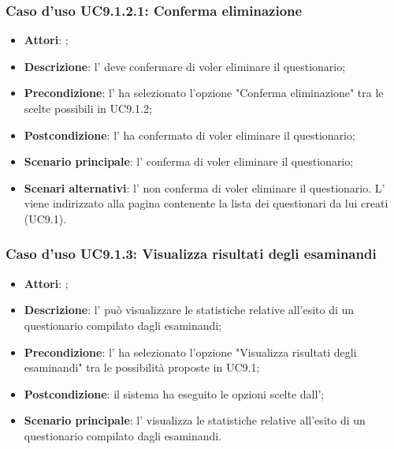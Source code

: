 				\subsubsection{Caso d'uso UC9.1.2.1: Conferma eliminazione}
				\label{UC9.1.2.1}
				\begin{itemize}
					\item \textbf{Attori}: \uaupro{};
					\item \textbf{Descrizione}: l'\uaupro{} deve confermare di voler eliminare il questionario; 
					\item \textbf{Precondizione}: l'\uaupro{} ha selezionato l'opzione "Conferma eliminazione" tra le scelte possibili in UC9.1.2;
					\item \textbf{Postcondizione}: l'\uaupro{} ha confermato di voler eliminare il questionario;
					\item \textbf{Scenario principale}: l'\uaupro{} conferma di voler eliminare il questionario;
					\item \textbf{Scenari alternativi}: l'\uaupro{} non conferma di voler eliminare il questionario. L'\uaupro{} viene indirizzato alla pagina contenente la lista dei questionari da lui creati (UC9.1).
				\end{itemize}
								
		\subsubsection{Caso d'uso UC9.1.3: Visualizza risultati degli esaminandi}
		\label{UC9.1.3}
		\begin{itemize}
			\item \textbf{Attori}: \uaupro{};
			\item \textbf{Descrizione}: l'\uaupro{} può visualizzare le statistiche relative all'esito di un  questionario compilato dagli esaminandi;
			\item \textbf{Precondizione}: l'\uaupro{} ha selezionato l'opzione "Visualizza risultati degli esaminandi" tra le possibilità proposte in UC9.1;
			\item \textbf{Postcondizione}: il sistema ha eseguito le opzioni scelte dall'\uaupro{};
			\item \textbf{Scenario principale}: l'\uaupro{} visualizza le statistiche relative all'esito di un questionario compilato dagli esaminandi. 
		\end{itemize}
		
